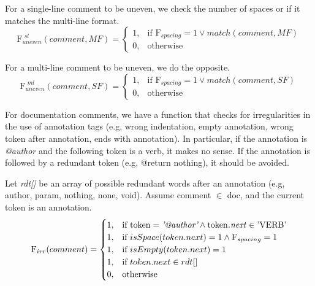\noindent For a single-line comment to be uneven, we check the number of spaces or if it matches the multi-line format.
\begin{equation*}
	\mathrm{F}_{uneven}^{\textit{ sl}}(comment, MF) = \begin{cases}
		1, & \text{if } \mathrm{F}_{spacing} = 1 \vee match(comment, MF) \\
		0, & \text{otherwise}
	\end{cases}
\end{equation*}

\noindent For a multi-line comment to be uneven, we do the opposite.
\begin{equation*}
	\mathrm{F}_{uneven}^{\textit{ ml}}(comment, SF) = \begin{cases}
		1, & \text{if } \mathrm{F}_{spacing} = 1 \vee match(comment, SF) \\
		0, & \text{otherwise}
	\end{cases}
\end{equation*}

\noindent For documentation comments, we have a function that checks for irregularities in the use of annotation tags (e.g, wrong indentation, empty annotation, wrong token after annotation, ends with annotation). In particular, if the annotation is \textit{@author} and the following token is a verb, it makes no sense. If the annotation is followed by a redundant token (e.g, @return nothing), it should be avoided.

\noindent Let \textit{rdt[]} be an array of possible redundant words after an annotation (e.g, author, param, nothing, none, void).
Assume comment $\in$ doc, and the current token is an annotation.
\begin{equation*}
	\mathrm{F}_{irr}(comment) = \begin{cases}
		1, & \text{if } \text{token} = \textit{'@author'} \wedge \text{token\textit{.next}} \in \text{'VERB'} \\
		1, & \text{if } isSpace(token.next) = 1 \wedge \mathrm{F}_{spacing} = 1 \\
		1, & \text{if } isEmpty(token.next) = 1 \\
		1, & \text{if } token.next \in rdt[] \\
		0, & \text{otherwise}
	\end{cases}
\end{equation*}
